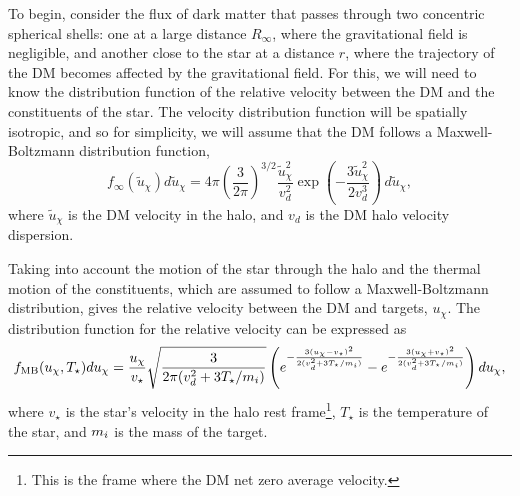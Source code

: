 To begin, consider the flux of dark matter that passes through two concentric spherical shells: one at a large distance $R_\infty$, where the gravitational field is negligible, and another close to the star at a distance $r$, where the trajectory of the DM becomes affected by the gravitational field.
For this, we will need to know the distribution function of the relative velocity between the DM and the constituents of the star. 
The velocity distribution function will be spatially isotropic, and so for simplicity, we will assume that the DM follows a Maxwell-Boltzmann distribution function, 
\begin{equation}
    f_\infty(\tilde{u}_\chi) d\tilde{u}_\chi= 4 \pi \left( \frac{3}{2 \pi} \right)^{3/2}\frac{\tilde{u}_\chi^2}{v_d^2} \exp\left(-\frac{3 \tilde u_\chi^2}{2 v_d^3}\right)\,d\tilde u_\chi, 
\end{equation}
where $\tilde u_\chi$ is the DM velocity in the halo, and $v_d$ is the DM halo velocity dispersion.

Taking into account the motion of the star through the halo and the thermal motion of the constituents, which are assumed to follow a Maxwell-Boltzmann distribution, gives the relative velocity between the DM and targets, $ u_\chi$. 
The distribution function for the relative velocity can be expressed as~\cite{Busoni:2017mhe_oct_Evaporationscatteringmomentum}
\begin{equation}
    f_{\mathrm{MB}}(u_\chi, T_\star)du_\chi = \frac{u_\chi}{v_\star} \sqrt{\frac{3 }{2 \pi (v_d^2 + 3 T_\star /m_i)}} \left( e^{-\frac{3(u_\chi - v_\star)^2}{2(v_d^2 + 3 T_\star /m_i)}} - e^{-\frac{3(u_\chi + v_\star)^2}{2(v_d^2 + 3 T_\star /m_i)}} \right)du_\chi,
    \label{ch3:eq:MB_finit_T}
\end{equation}
where $v_\star$ is the star's velocity in the halo rest frame\footnote{This is the frame where the DM net zero average velocity.}, $T_\star$ is the temperature of the star, and $m_i$ is the mass of the target.

